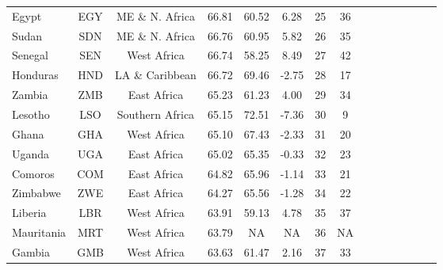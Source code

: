 {\begin{longtable}{lcccccccccccccc}
Egypt                             & EGY           & ME \& N. Africa    & 66.81             & 60.52               & 6.28               & 25            & 36              \\
Sudan                             & SDN           & ME \& N. Africa    & 66.76             & 60.95               & 5.82               & 26            & 35              \\
Senegal                           & SEN           & West Africa        & 66.74             & 58.25               & 8.49               & 27            & 42              \\
Honduras                          & HND           & LA \& Caribbean    & 66.72             & 69.46               & -2.75              & 28            & 17              \\
Zambia                            & ZMB           & East Africa        & 65.23             & 61.23               & 4.00               & 29            & 34              \\
Lesotho                           & LSO           & Southern Africa    & 65.15             & 72.51               & -7.36              & 30            & 9               \\
Ghana                             & GHA           & West Africa        & 65.10             & 67.43               & -2.33              & 31            & 20              \\
Uganda                            & UGA           & East Africa        & 65.02             & 65.35               & -0.33              & 32            & 23              \\
Comoros                           & COM           & East Africa        & 64.82             & 65.96               & -1.14              & 33            & 21              \\
Zimbabwe                          & ZWE           & East Africa        & 64.27             & 65.56               & -1.28              & 34            & 22              \\
Liberia                           & LBR           & West Africa        & 63.91             & 59.13               & 4.78               & 35            & 37              \\
Mauritania                        & MRT           & West Africa        & 63.79             & NA                  & NA                 & 36            & NA              \\
Gambia                            & GMB           & West Africa        & 63.63             & 61.47               & 2.16               & 37            & 33              \\

\end{longtable}}

